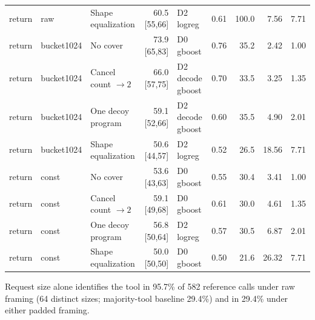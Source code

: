 \begin{table}[!ht]
\begin{tabular}{@{}lllrlrrrr@{}}
return & raw & Shape equalization & 60.5 [55,66] & D2 logreg & 0.61 & 100.0 & 7.56 & 7.71\\
return & bucket1024 & No cover & 73.9 [65,83] & D0 gboost & 0.76 & 35.2 & 2.42 & 1.00\\
return & bucket1024 & Cancel count $\to 2$ & 66.0 [57,75] & D2 decode gboost & 0.70 & 33.5 & 3.25 & 1.35\\
return & bucket1024 & One decoy program & 59.1 [52,66] & D2 decode gboost & 0.60 & 35.5 & 4.90 & 2.01\\
return & bucket1024 & Shape equalization & 50.6 [44,57] & D2 logreg & 0.52 & 26.5 & 18.56 & 7.71\\
return & const & No cover & 53.6 [43,63] & D0 gboost & 0.55 & 30.4 & 3.41 & 1.00\\
return & const & Cancel count $\to 2$ & 59.1 [49,68] & D0 gboost & 0.61 & 30.0 & 4.61 & 1.35\\
return & const & One decoy program & 56.8 [50,64] & D2 logreg & 0.57 & 30.5 & 6.87 & 2.01\\
return & const & Shape equalization & 50.0 [50,50] & D0 gboost & 0.50 & 21.6 & 26.32 & 7.71\\
\bottomrule\end{tabular}
\par\smallskip Request size alone identifies the tool in 95.7\% of 582 reference calls under raw framing (64 distinct sizes; majority-tool baseline 29.4\%) and in 29.4\% under either padded framing.
\end{table}
